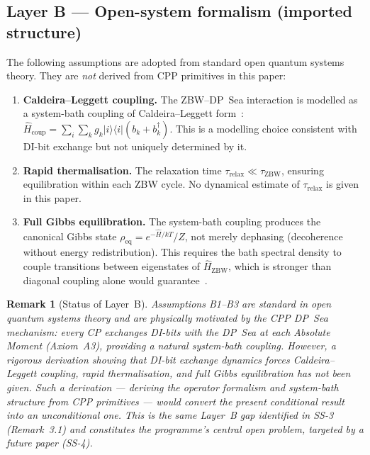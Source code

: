 \documentclass[11pt]{article}
\newtheorem{remark}{Remark}[section]
\newcommand{\ZBW}{\mathrm{ZBW}}
\begin{document}
\subsection{Layer B --- Open-system formalism (imported structure)}
\label{sec:layerb}

The following assumptions are adopted from standard open quantum
systems theory.  They are \emph{not} derived from CPP primitives
in this paper:
\begin{enumerate}[label=(B\arabic*)]
\item \textbf{Caldeira--Leggett coupling.}  The ZBW--DP~Sea
  interaction is modelled as a system-bath coupling of
  Caldeira--Leggett form~\cite{caldeira1983}:
  $\hat{H}_{\mathrm{coup}} = \sum_i\sum_k g_k|i\rangle\langle i|
  (b_k + b_k^\dagger)$.
  This is a modelling choice consistent with DI-bit exchange
  but not uniquely determined by it.
\item \textbf{Rapid thermalisation.}  The relaxation time
  $\tau_{\mathrm{relax}} \ll \tau_{\mathrm{ZBW}}$, ensuring
  equilibration within each ZBW cycle.  No dynamical estimate
  of $\tau_{\mathrm{relax}}$ is given in this paper.
\item \textbf{Full Gibbs equilibration.}  The system-bath
  coupling produces the canonical Gibbs state
  $\rho_{\mathrm{eq}} = e^{-\hat{H}/kT}/Z$, not merely
  dephasing (decoherence without energy redistribution).
  This requires the bath spectral density to couple
  transitions between eigenstates of $\hat{H}_{\ZBW}$, which
  is stronger than diagonal coupling alone would
  guarantee~\cite{breuer2002}.
\end{enumerate}

\begin{remark}[Status of Layer~B]
\label{rem:layerb}
Assumptions B1--B3 are standard in open quantum systems theory
and are physically motivated by the CPP DP~Sea mechanism: every
CP exchanges DI-bits with the DP~Sea at each Absolute Moment
(Axiom~A3), providing a natural system-bath coupling.  However,
a rigorous derivation showing that DI-bit exchange dynamics
\emph{forces} Caldeira--Leggett coupling, rapid thermalisation,
and full Gibbs equilibration has not been given.  Such a
derivation --- deriving the operator formalism and system-bath
structure from CPP primitives --- would convert the present
conditional result into an unconditional one.  This is the same
Layer~B gap identified in SS-3 (Remark~3.1) and constitutes
the programme's central open problem, targeted by a future
paper (SS-4).
\end{remark}
\end{document}
